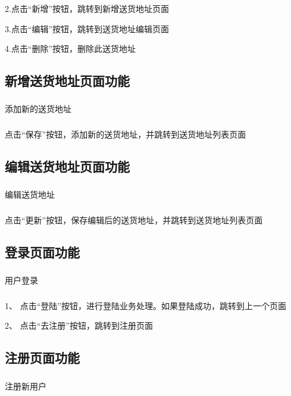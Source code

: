 2.点击“新增”按钮，跳转到新增送货地址页面

3.点击“编辑”按钮，跳转到送货地址编辑页面

4.点击“删除”按钮，删除此送货地址

\subsection{新增送货地址页面功能}
\subsubsection*{}
添加新的送货地址
\subsubsection*{}
点击“保存”按钮，添加新的送货地址，并跳转到送货地址列表页面

\subsection{编辑送货地址页面功能}
\subsubsection*{}
编辑送货地址
\subsubsection*{}
点击“更新”按钮，保存编辑后的送货地址，并跳转到送货地址列表页面

\subsection{登录页面功能}
\subsubsection*{}
用户登录
\subsubsection*{}
1、 点击“登陆”按钮，进行登陆业务处理。如果登陆成功，跳转到上一个页面

2、 点击“去注册”按钮，跳转到注册页面

\subsection{注册页面功能}
\subsubsection*{}
注册新用户
